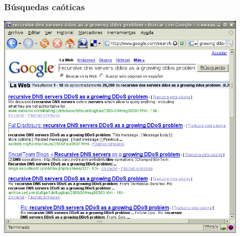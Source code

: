 \documentclass[spanish,notes=hide]{beamer}
\begin{document}
\frame
{
  \frametitle{Búsquedas caóticas}

  \begin{center}
    \includegraphics[width=0.9\textwidth]{images/query-google.png}
  \end{center}
}
\end{document}
